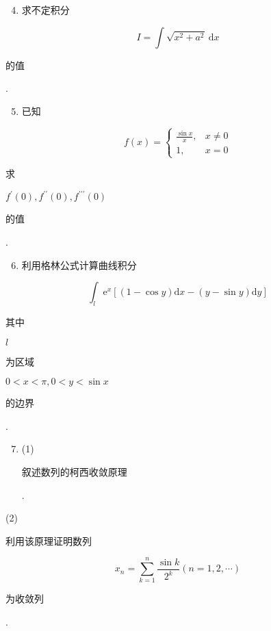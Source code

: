 \documentclass[10pt]{article}
\begin{document}
\begin{enumerate}
  \setcounter{enumi}{3}
  \item \begin{CJK}{UTF8}{mj}求不定积分\end{CJK}
\end{enumerate}
$$
I=\int \sqrt{x^{2}+a^{2}} \mathrm{~d} x
$$
\begin{CJK}{UTF8}{mj}的值\end{CJK}.

\begin{enumerate}
  \setcounter{enumi}{4}
  \item \begin{CJK}{UTF8}{mj}已知\end{CJK}
\end{enumerate}
$$
f(x)= \begin{cases}\frac{\sin x}{x}, & x \neq 0 \\ 1, & x=0\end{cases}
$$
\begin{CJK}{UTF8}{mj}求\end{CJK} $f^{\prime}(0), f^{\prime \prime}(0), f^{\prime \prime \prime}(0)$ \begin{CJK}{UTF8}{mj}的值\end{CJK}.

\begin{enumerate}
  \setcounter{enumi}{5}
  \item \begin{CJK}{UTF8}{mj}利用格林公式计算曲线积分\end{CJK}
\end{enumerate}
$$
\int_{l} \mathrm{e}^{x}[(1-\cos y) \mathrm{d} x-(y-\sin y) \mathrm{d} y]
$$
\begin{CJK}{UTF8}{mj}其中\end{CJK} $l$ \begin{CJK}{UTF8}{mj}为区域\end{CJK} $0<x<\pi, 0<y<\sin x$ \begin{CJK}{UTF8}{mj}的边界\end{CJK}.

\begin{enumerate}
  \setcounter{enumi}{6}
  \item (1) \begin{CJK}{UTF8}{mj}叙述数列的柯西收敛原理\end{CJK}.
\end{enumerate}
(2) \begin{CJK}{UTF8}{mj}利用该原理证明数列\end{CJK}
$$
x_{n}=\sum_{k=1}^{n} \frac{\sin k}{2^{k}}(n=1,2, \cdots)
$$
\begin{CJK}{UTF8}{mj}为收敛列\end{CJK}.
\end{document}
